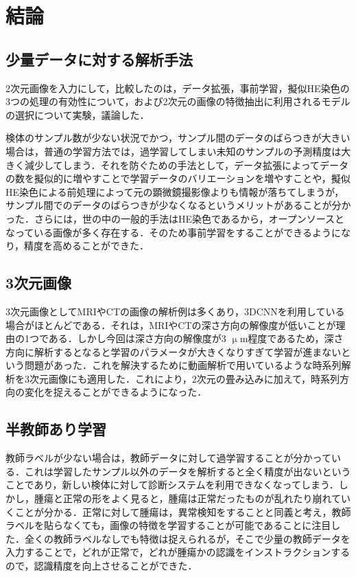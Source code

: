\chapter{結論}

\section{少量データに対する解析手法}
2次元画像を入力にして，比較したのは，データ拡張，事前学習，擬似HE染色の3つの処理の有効性について，および2次元の画像の特徴抽出に利用されるモデルの選択について実験，議論した．

検体のサンプル数が少ない状況でかつ，サンプル間のデータのばらつきが大きい場合は，普通の学習方法では，過学習してしまい未知のサンプルの予測精度は大きく減少してしまう．それを防ぐための手法として，データ拡張によってデータの数を擬似的に増やすことで学習データのバリエーションを増やすことや，擬似HE染色による前処理によって元の顕微鏡撮影像よりも情報が落ちてしまうが，サンプル間でのデータのばらつきが少なくなるというメリットがあることが分かった．さらには，世の中の一般的手法はHE染色であるから，オープンソースとなっている画像が多く存在する．そのため事前学習をすることができるようになり，精度を高めることができた．

\section{3次元画像}
3次元画像としてMRIやCTの画像の解析例は多くあり，3DCNNを利用している場合がほとんどである．それは，MRIやCTの深さ方向の解像度が低いことが理由の1つである．しかし今回は深さ方向の解像度が3 $\upmu$m程度であるため，深さ方向に解析するとなると学習のパラメータが大きくなりすぎて学習が進まないという問題があった．これを解決するために動画解析で用いているような時系列解析を3次元画像にも適用した．これにより，2次元の畳み込みに加えて，時系列方向の変化を捉えることができるようになった．

\section{半教師あり学習}
教師ラベルが少ない場合は，教師データに対して過学習することが分かっている．これは学習したサンプル以外のデータを解析すると全く精度が出ないということであり，新しい検体に対して診断システムを利用できなくなってしまう．しかし，腫瘍と正常の形をよく見ると，腫瘍は正常だったものが乱れたり崩れていくことが分かる．正常に対して腫瘍は，異常検知をすることと同義と考え，教師ラベルを貼らなくても，画像の特徴を学習することが可能であることに注目した．全くの教師ラベルなしでも特徴は捉えられるが，そこで少量の教師データを入力することで，どれが正常で，どれが腫瘍かの認識をインストラクションするので，認識精度を向上させることができた．

